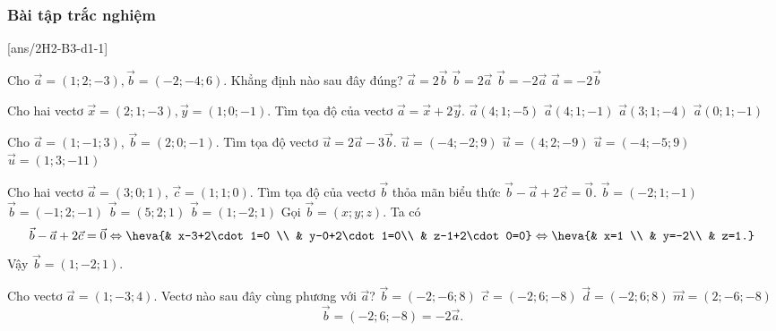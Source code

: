 \subsubsection{Bài tập trắc nghiệm}
\TN
{}[ans/2H2-B3-d1-1]
\begin{ex}
	Cho $\vec{a}=(1;2;-3),\vec{b}=(-2;-4;6)$. Khẳng định nào sau đây đúng?
	\choice
	{$\vec{a}=2\vec{b}$}
	{$\vec{b}=2\vec{a}$}
	{\True $\vec{b}=-2\vec{a}$}
	{$\vec{a}=-2\vec{b}$}
\end{ex} 

\begin{ex}
	Cho hai vectơ $\vec{x}=(2;1;-3),\vec{y}=(1;0;-1)$. Tìm tọa độ của vectơ $\vec{a}=\vec{x}+2\vec{y}$.
	\choice
	{\True $\vec{a}(4;1;-5)$}
	{$\vec{a}(4;1;-1)$}
	{$\vec{a}(3;1;-4)$}
	{$\vec{a}(0;1;-1)$}
\end{ex} 

\begin{ex}
	Cho $\vec{a}=(1;-1;3)$, $\vec{b}=(2;0;-1)$. Tìm tọa độ vectơ $\vec{u}=2\vec{a}-3\vec{b}$.
	\choice
	{\True $\vec{u}=(-4;-2;9)$}
	{$\vec{u}=(4;2;-9)$}
	{$\vec{u}=(-4;-5;9)$}
	{$\vec{u}=(1;3;-11)$}
\end{ex} 

\begin{ex}
	Cho hai vectơ  $\vec{a}=(3;0;1)$,  $\vec{c}=(1;1;0)$. Tìm tọa độ của vectơ $\vec{b}$ thỏa mãn biểu thức  $\vec{b}-\vec{a}+2\vec{c}=\vec{0}$.
	\choice
	{$\vec{b}=(-2;1;-1)$}
	{$\vec{b}=(-1;2;-1)$}
	{$\vec{b}=(5;2;1)$}
	{\True $\vec{b}=(1;-2;1)$}
	\loigiai
	{Gọi $\vec{b}=\left(x; y; z\right)$. Ta có
		$$\vec{b}-\vec{a}+2\vec{c}=\vec{0}\Leftrightarrow\heva{& x-3+2\cdot 1=0 \\ & y-0+2\cdot 1=0\\ & z-1+2\cdot 0=0}\Leftrightarrow\heva{& x=1 \\ & y=-2\\ & z=1.}$$
		Vậy $\vec{b}=(1;-2;1)$.
	}
\end{ex} 

\begin{ex}
	Cho vectơ $\vec{a}=(1;-3;4)$. Vectơ  nào sau đây cùng phương với $\vec{a}$?
	\choice
	{$\vec{b}=(-2;-6;8)$}
	{\True $\vec{c}=(-2;6;-8)$}
	{$\vec{d}=(-2;6;8)$}
	{$\vec{m}=(2;-6;-8)$}
	\loigiai
	{
		$$\vec{b}=(-2;6;-8)=-2\vec{a}.$$
	}
\end{ex} 

